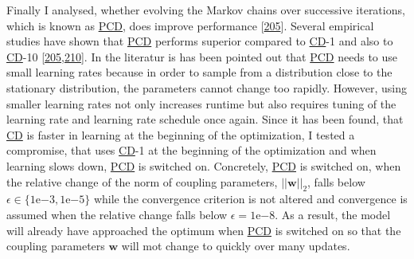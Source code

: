 \documentclass[11pt,a4paper,twoside]{book}
\newcommand{\eq}{\!=\!}
\newcommand{\w}{\mathbf{w}}
\theoremstyle{definition}
\theoremstyle{definition}
\theoremstyle{remark}
\begin{document}
Finally I analysed, whether evolving the Markov chains over successive
iterations, which is known as \protect\hyperlink{abbrev}{PCD}, does
improve performance {[}\protect\hyperlink{ref-Tieleman2008}{205}{]}.
Several empirical studies have shown that
\protect\hyperlink{abbrev}{PCD} performs superior compared to
\protect\hyperlink{abbrev}{CD}-1 and also to
\protect\hyperlink{abbrev}{CD}-10
{[}\protect\hyperlink{ref-Tieleman2008}{205},\protect\hyperlink{ref-Swersky2010}{210}{]}.
In the literatur is has been pointed out that
\protect\hyperlink{abbrev}{PCD} needs to use small learning rates
because in order to sample from a distribution close to the stationary
distribution, the parameters cannot change too rapidly. However, using
smaller learning rates not only increases runtime but also requires
tuning of the learning rate and learning rate schedule once again. Since
it has been found, that \protect\hyperlink{abbrev}{CD} is faster in
learning at the beginning of the optimization, I tested a compromise,
that uses \protect\hyperlink{abbrev}{CD}-1 at the beginning of the
optimization and when learning slows down,
\protect\hyperlink{abbrev}{PCD} is switched on. Concretely,
\protect\hyperlink{abbrev}{PCD} is switched on, when the relative change
of the norm of coupling parameters, \(||\w||_2\), falls below
\(\epsilon \in \{\mathrm{1e}{-3}, \mathrm{1e}{-5}\}\) while the
convergence criterion is not altered and convergence is assumed when the
relative change falls below \(\epsilon \eq \mathrm{1e}{-8}\). As a
result, the model will already have approached the optimum when
\protect\hyperlink{abbrev}{PCD} is switched on so that the coupling
parameters \(\w\) will mot change to quickly over many updates.
\end{document}
